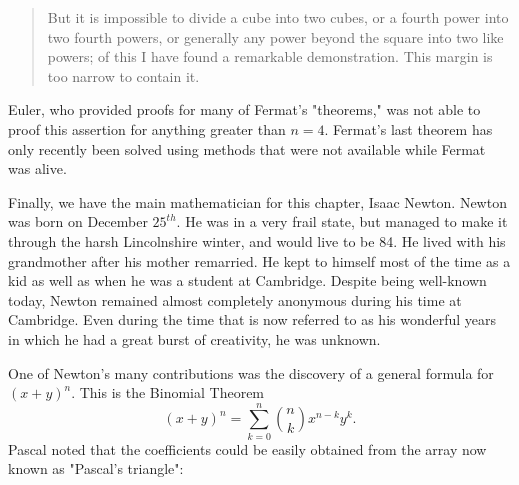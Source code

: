 \documentclass[12pt]{article}
\begin{document}
\vspace{-5mm}
\begin{quote}
But it is impossible to divide a cube into two cubes, or a fourth power into two fourth powers, or generally any power beyond the square into two like powers; of this I have found a remarkable demonstration. This margin is too narrow to contain it.
\end{quote}
\vspace{-5mm}
\begin{doublespace}
Euler, who provided proofs for many of Fermat's "theorems," was not able to proof this assertion for anything greater than $n=4$. Fermat's last theorem has only recently been solved using methods that were not available while Fermat was alive.

Finally, we have the main mathematician for this chapter, Isaac Newton. Newton was born on December $25^{th}$. He was in a very frail state, but managed to make it through the harsh Lincolnshire winter, and would live to be 84. He lived with his grandmother after his mother remarried. He kept to himself most of the time as a kid as well as when he was a student at Cambridge. Despite being well-known today, Newton remained almost completely anonymous during his time at Cambridge. Even during the time that is now referred to as his wonderful years in which he had a great burst of creativity, he was unknown.

One of Newton's many contributions was the discovery of a general formula for $(x+y)^n$. This is the Binomial Theorem
\[(x+y)^n = \sum_{k=0}^n {n \choose k}x^{n-k}y^k. \]
Pascal noted that the coefficients could be easily obtained from the array now known as  "Pascal's triangle":
\end{doublespace}
\end{document}
